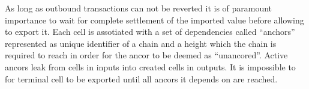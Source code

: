 As long as outbound transactions can not be reverted it is of paramount importance to wait for complete settlement of the imported value before allowing to export it.
Each cell is assotiated with a set of dependencies called \enquote{anchors} represented as unique identifier of a chain and a height which the chain is required to reach in order for the ancor to be deemed as \enquote{unancored}.
Active ancors leak from cells in inputs into created cells in outputs.
It is impossible to for terminal cell to be exported until all ancors it depends on are reached.
